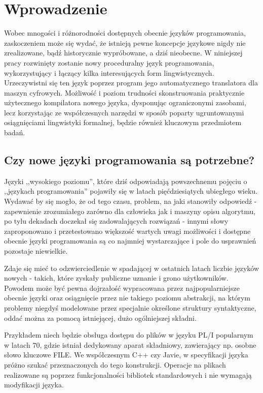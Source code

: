 \chapter{Wprowadzenie}
\label{cha:wstep}

Wobec mnogości i różnorodności dostępnych obecnie języków programowania, zaskoczeniem może się wydać, że istnieją pewne koncepcje językowe nigdy nie zrealizowane, bądź historycznie wypróbowane, a dziś nieobecne. W niniejszej pracy rozwinięty zostanie nowy proceduralny język programowania, wykorzystujący i łączący kilka interesujących form lingwistycznych.
Urzeczywistni się ten język poprzez program jego automatycznego translatora dla maszyn cyfrowych. Możliwość i poziom trudności skonstruowania praktycznie użytecznego kompilatora nowego języka, dysponując ograniczonymi zasobami, lecz korzystając ze współczesnych narzędzi w sposób poparty ugruntowanymi osiągnięciami lingwistyki formalnej, będzie również kluczowym przedmiotem badań.


\section{Czy nowe języki programowania są potrzebne?}
\label{czy_potrzebne}
Języki ,,wysokiego poziomu'', które dziś odpowiadają powszechnemu pojęciu o ,,językach programowania'' pojawiły się w latach pięćdziesiątych ubiegłego wieku\cite[s.~13]{DRAGON_BOOK}. Wydawać by się mogło, że od tego czasu, problem, na jaki stanowiły odpowiedź - zapewnienie zrozumiałego zarówno dla człowieka jak i maszyny opisu algorytmu, po tylu dekadach doczekał się zadowalających rozwiązań - innymi słowy zaproponowano i przetestowano większość wartych uwagi możliwości i dostępne obecnie języki programowania są co najmniej wystarczające i pole do usprawnień pozostaje niewielkie.

Zdaje się mieć to odzwierciedlenie w spadającej w ostatnich latach liczbie języków nowych - takich, które zyskały publiczne uznanie i grono użytkowników\cite{valverde2015}. Powodem może być pewna dojrzałość wypracowana przez najpopularniejsze obecnie języki oraz osiągnięcie przez nie takiego poziomu abstrakcji, na którym problemy niegdyś modelowane przez specjalnie określone struktury syntaktyczne, oddać można za pomocą istniejącej, dużo ogólniejszej składni.

Przykładem niech będzie obsługa dostępu do plików w języku PL/I popularnym w latach 70, gdzie istniał dedykowany aparat składniowy, zawierający np. osobne słowo kluczowe FILE\cite[s.~96]{plif}. We współczesnym C++ czy Javie, w specyfikacji języka próżno szukać przeznaczonych do tego konstrukcji. Operacje na plikach realizowane są poprzez funkcjonalności bibliotek standardowych i nie wymagają modyfikacji języka.

